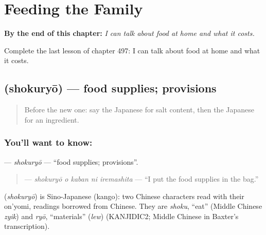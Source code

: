 
\chapter{Feeding the Family}
\label{ch:ja-feeding-the-family}

\begin{chapteropening}
\textbf{By the end of this chapter:} \emph{I can talk about food at home and what it costs.}

Complete the last lesson of chapter 497: I can talk about food at home and what it costs.
\end{chapteropening}

\section[\texorpdfstring{\ja{しょくりょう} (shokuryō)}{しょくりょう (shokuryō)}]{ (shokuryō) — food supplies; provisions}

\label{lesson:JA-C497-shokuryou}



\begin{quote}
Before the new one: say the Japanese for salt content, then the Japanese for an ingredient.
\end{quote}

\subsection*{You'll want to know: }
\textbf{} — \emph{shokuryō} — \textquotedblleft{}food supplies; provisions\textquotedblright{}.

\begin{quote}
\textbf{  } — \emph{shokuryō o kaban ni iremashita} — \textquotedblleft{}I put the food supplies in the bag.\textquotedblright{}
\end{quote}

\begin{cousinweb}
\textbf{} (\emph{shokuryō}) is Sino-Japanese (kango): two Chinese characters read with their on'yomi, readings borrowed from Chinese. They are \emph{shoku}, \textquotedblleft{}eat\textquotedblright{} (Middle Chinese \emph{zyik}) and \emph{ryō}, \textquotedblleft{}materials\textquotedblright{} (\emph{lew}) (KANJIDIC2; Middle Chinese in Baxter's transcription).
\end{cousinweb}

